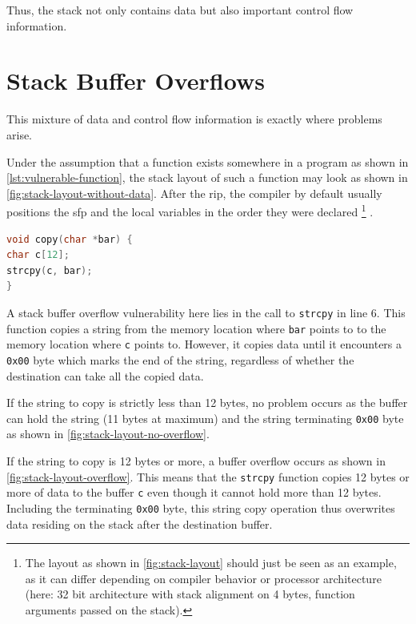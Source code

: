 Thus, the stack not only contains data but also important control flow information.

\section{Stack Buffer Overflows}
\label{sec:stack-buffer-overflows}

This mixture of data and control flow information is exactly where problems arise.

Under the assumption that a function exists somewhere in a program as shown in \cref{lst:vulnerable-function}, the stack layout of such a function may look as shown in \cref{fig:stack-layout-without-data}.
After the \gls{rip}, the compiler by default usually positions the \gls{sfp} and the local variables in the order they were declared%
	\footnote{
		The layout as shown in \cref{fig:stack-layout} should just be seen as an example, as it can differ depending on compiler behavior or processor architecture (here: 32 bit architecture with stack alignment on 4 bytes, function arguments passed on the stack).
	}%
.

\begin{lstlisting}[language=C,float=ht,caption={C function with buffer overflow vulnerability}, label={lst:vulnerable-function}]
void copy(char *bar) {
char c[12];
strcpy(c, bar);
}
\end{lstlisting}

A stack buffer overflow vulnerability here lies in the call to \texttt{strcpy} in line 6.
This function copies a string from the memory location where \texttt{bar} points to to the memory location where \texttt{c} points to.
However, it copies data until it encounters a \texttt{0x00} byte which marks the end of the string, regardless of whether the destination can take all the copied data.

If the string to copy is strictly less than 12 bytes, no problem occurs as the buffer can hold the string (11 bytes at maximum) and the string terminating \texttt{0x00} byte as shown in \cref{fig:stack-layout-no-overflow}.

If the string to copy is 12 bytes or more, a buffer overflow occurs as shown in \cref{fig:stack-layout-overflow}.
This means that the \texttt{strcpy} function copies 12 bytes or more of data to the buffer \texttt{c} even though it cannot hold more than 12 bytes.
Including the terminating \texttt{0x00} byte, this string copy operation thus overwrites data residing on the stack after the destination buffer.

